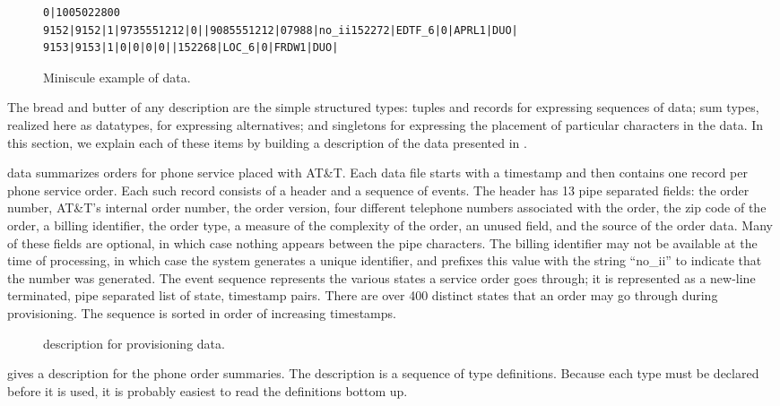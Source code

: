 \begin{figure*}
{\scriptsize
\begin{verbatim}
0|1005022800
9152|9152|1|9735551212|0||9085551212|07988|no_ii152272|EDTF_6|0|APRL1|DUO|
9153|9153|1|0|0|0|0||152268|LOC_6|0|FRDW1|DUO|
\end{verbatim}
}
  \caption{Miniscule example of \dibbler{} data.}
  \label{figure:dibbler-records}
\end{figure*}

The bread and butter of any \padsml{} description are the simple
structured types: tuples and records for expressing sequences of data;
sum types, realized here as datatypes, for expressing alternatives;
and singletons for expressing the placement of particular
characters in the data.  In this section, we explain each of these
items by building a description of the \dibbler{} data presented in
.

\dibbler{} data summarizes orders for phone service placed with AT\&T.
Each \dibbler{} data file starts with a timestamp and then contains one
record per phone service order.
Each such record consists of a header and a sequence of
events.  The header has 13 pipe separated fields: the order number,
AT\&T's internal order number, the order version, four different
telephone numbers associated with the order, the zip code of the
order, a billing identifier, the order type, a measure of the
complexity of the order, an unused field, and the source of the order
data.  Many of these fields are optional, in which case nothing
appears between the pipe characters.  The billing identifier may not
be available at the time of processing, in which case the system
generates a unique identifier, and prefixes this value with the string
``no\_ii'' to indicate that the number was generated. The event sequence
represents the various states a service order goes through; it is
represented as a new-line terminated, pipe separated list of state,
timestamp pairs.  There are over 400 distinct states that an order may
go through during provisioning.  The sequence is sorted in order of
increasing timestamps.

\begin{figure}
  
  \caption{\padsml{} description for \dibbler{} provisioning data.}
  \label{figure:sirius_pml}
\end{figure}

 gives a \padsml{} description for the
\dibbler{} phone order summaries. The description is a
sequence of type definitions. Because each type must be declared
before it is used, it is probably easiest to read the definitions
bottom up. 

